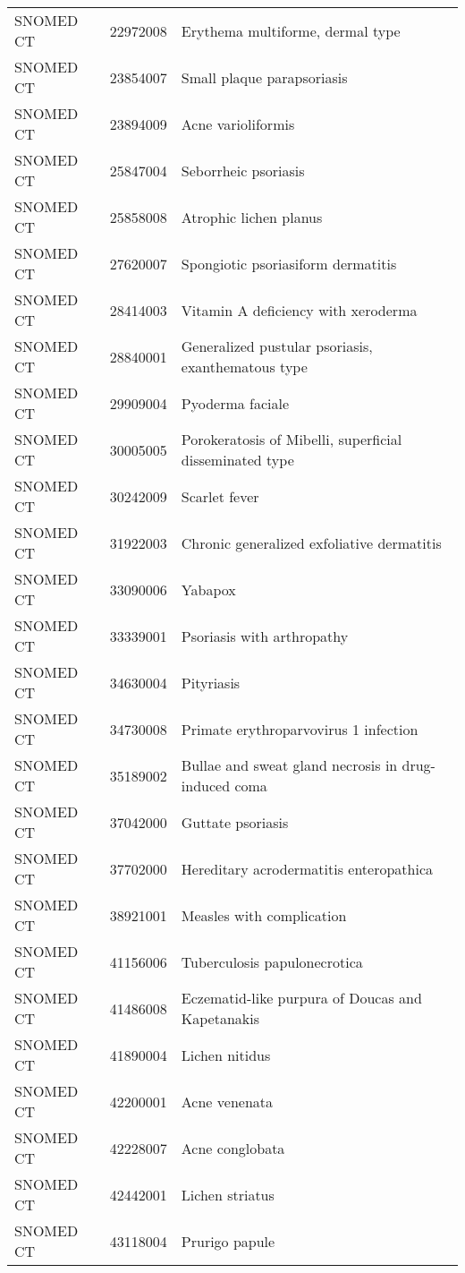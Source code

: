\begin{longtable}{p{}p{}p{}}
  SNOMED CT & 22972008 & Erythema multiforme, dermal type \\ 
  SNOMED CT & 23854007 & Small plaque parapsoriasis \\ 
  SNOMED CT & 23894009 & Acne varioliformis \\ 
  SNOMED CT & 25847004 & Seborrheic psoriasis \\ 
  SNOMED CT & 25858008 & Atrophic lichen planus \\ 
  SNOMED CT & 27620007 & Spongiotic psoriasiform dermatitis \\ 
  SNOMED CT & 28414003 & Vitamin A deficiency with xeroderma \\ 
  SNOMED CT & 28840001 & Generalized pustular psoriasis, exanthematous type \\ 
  SNOMED CT & 29909004 & Pyoderma faciale \\ 
  SNOMED CT & 30005005 & Porokeratosis of Mibelli, superficial disseminated type \\ 
  SNOMED CT & 30242009 & Scarlet fever \\ 
  SNOMED CT & 31922003 & Chronic generalized exfoliative dermatitis \\ 
  SNOMED CT & 33090006 & Yabapox \\ 
  SNOMED CT & 33339001 & Psoriasis with arthropathy \\ 
  SNOMED CT & 34630004 & Pityriasis \\ 
  SNOMED CT & 34730008 & Primate erythroparvovirus 1 infection \\ 
  SNOMED CT & 35189002 & Bullae and sweat gland necrosis in drug-induced coma \\ 
  SNOMED CT & 37042000 & Guttate psoriasis \\ 
  SNOMED CT & 37702000 & Hereditary acrodermatitis enteropathica \\ 
  SNOMED CT & 38921001 & Measles with complication \\ 
  SNOMED CT & 41156006 & Tuberculosis papulonecrotica \\ 
  SNOMED CT & 41486008 & Eczematid-like purpura of Doucas and Kapetanakis \\ 
  SNOMED CT & 41890004 & Lichen nitidus \\ 
  SNOMED CT & 42200001 & Acne venenata \\ 
  SNOMED CT & 42228007 & Acne conglobata \\ 
  SNOMED CT & 42442001 & Lichen striatus \\ 
  SNOMED CT & 43118004 & Prurigo papule \\ 

\end{longtable}
